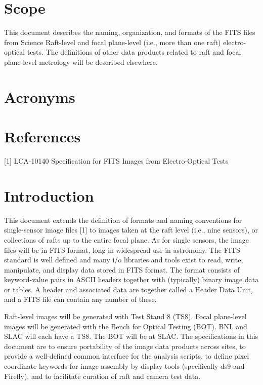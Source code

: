 \documentclass{article}[12pt]
\begin{document}
\section{Scope}
This document describes the naming, organization, and formats of the FITS files from Science Raft-level and focal plane-level (i.e., more than one raft) electro-optical tests.  The definitions of other data products related to raft and focal plane-level metrology will be described elsewhere.

\section{Acronyms}

\section{References}

[1] LCA-10140 Specification for FITS Images from Electro-Optical Tests





\section{Introduction}
This document extends the definition of formats and naming conventions for single-sensor image files [1] to images taken at the raft level (i.e., nine sensors), or collections of rafts up to the entire focal plane.  As for single sensors, the image files will be in FlTS format, long in widespread use in astronomy.  The FITS standard is well defined and many i/o libraries and tools exist to read, write, manipulate, and display data stored in FITS format.  The format consists of keyword-value pairs in ASCII headers together with (typically) binary image data or tables.  A header and associated data are together called a Header Data Unit, and a FITS file can contain any number of these.

Raft-level images will be generated with Test Stand 8 (TS8).  Focal plane-level images will be generated with the Bench for Optical Testing (BOT).  BNL and SLAC will each have a TS8.  The BOT will be at SLAC.  The specifications in this document are to ensure portability of the image data products across sites, to provide a well-defined common interface for the analysis scripts, to define pixel coordinate keywords for image assembly by display tools (specifically ds9 and Firefly), and to facilitate curation of raft and camera test data.
\end{document}
